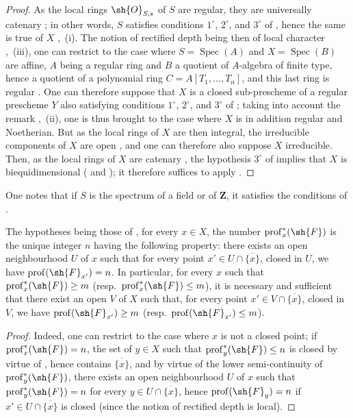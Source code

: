\begin{proof}
As the local rings $\sh{O}_{S,s}$ of $S$ are regular, they are universally catenary ; in other words, $S$ satisfies conditions $1^\circ$, $2^\circ$, and $3^\circ$ of , hence the same is true of $X$ ,~(i).
The notion of rectified depth being then of local character ,~(iii), one can restrict to the case where $S=\operatorname{Spec}(A)$ and $X=\operatorname{Spec}(B)$ are affine, $A$ being a regular ring and $B$ a quotient of $A$-algebra of finite type, hence a quotient of a polynomial ring $C=A[T_1,\ldots,T_n]$, and this last ring is regular .
One can therefore suppose that $X$ is a closed sub-prescheme of a regular prescheme $Y$ also satisfying conditions $1^\circ$, $2^\circ$, and $3^\circ$ of ; taking into account the remark ,~(ii), one is thus brought to the case where $X$ is in addition regular and Noetherian.
But as the local rings of $X$ are then integral, the irreducible components of $X$ are
open , and one can therefore also suppose $X$ irreducible.
Then, as the local rings of $X$ are catenary , the hypothesis $3^\circ$ of  implies that $X$ is biequidimensional ( and ); it therefore suffices to apply .
\end{proof}

One notes that if $S$ is the spectrum of a field or of $\mathbf{Z}$, it satisfies the conditions of .

\begin{corollary}[10.8.6]
\label{IV.10.8.6}
The hypotheses being those of , for every $x\in X$, the number $\operatorname{prof}^*_x(\sh{F})$ is the unique integer $n$ having the following property: there exists an open neighbourhood $U$ of $x$ such that for every point $x'\in U\cap\overline{\{x\}}$, closed in $U$, we have $\operatorname{prof}(\sh{F}_{x'})=n$.
In particular, for every $x$ such that $\operatorname{prof}^*_x(\sh{F})\geq m$ (resp.\ $\operatorname{prof}^*_x(\sh{F})\leq m$), it is necessary and sufficient that there exist an open $V$ of $X$ such that, for every point $x'\in V\cap\overline{\{x\}}$, closed in $V$, we have $\operatorname{prof}(\sh{F}_{x'})\geq m$ (resp.\ $\operatorname{prof}(\sh{F}_{x'})\leq m$).
\end{corollary}

\begin{proof}
Indeed, one can restrict to the case where $x$ is not a closed point; if $\operatorname{prof}^*_x(\sh{F})=n$, the set of $y\in X$ such that $\operatorname{prof}^*_y(\sh{F})\leq n$ is closed by virtue of , hence contains $\overline{\{x\}}$, and by virtue of the lower semi-continuity of $\operatorname{prof}^*_y(\sh{F})$, there exists an open neighbourhood $U$ of $x$ such that $\operatorname{prof}^*_y(\sh{F})=n$ for every $y\in U\cap\overline{\{x\}}$, hence $\operatorname{prof}(\sh{F}_y)=n$ if $x'\in U\cap\overline{\{x\}}$ is closed (since the notion of rectified depth is local).
\end{proof}


